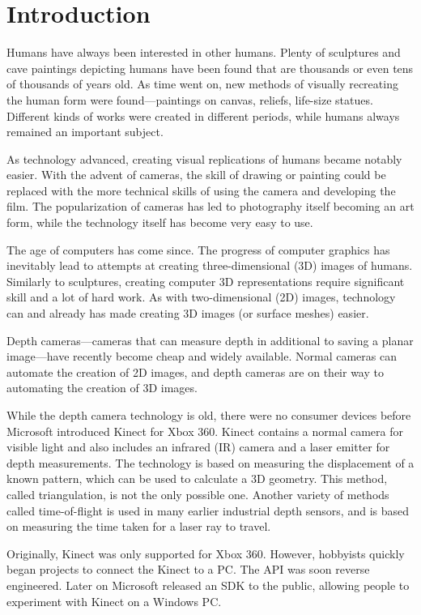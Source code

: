 \chapter{Introduction}

Humans have always been interested in other humans. Plenty of sculptures and cave paintings depicting humans have been found that are thousands or even tens of thousands of years old. As time went on, new methods of visually recreating the human form were found---paintings on canvas, reliefs, life-size statues. Different kinds of works were created in different periods, while humans always remained an important subject.

As technology advanced, creating visual replications of humans became notably easier. With the advent of cameras, the skill of drawing or painting could be replaced with the more technical skills of using the camera and developing the film. The popularization of cameras has led to photography itself becoming an art form, while the technology itself has become very easy to use.

The age of computers has come since. The progress of computer graphics has inevitably lead to attempts at creating three-dimensional (3D) images of humans. Similarly to sculptures, creating computer 3D representations require significant skill and a lot of hard work. As with two-dimensional (2D) images, technology can and already has made creating 3D images (or surface meshes) easier.

Depth cameras---cameras that can measure depth in additional to saving a planar image---have recently become cheap and widely available. Normal cameras can automate the creation of 2D images, and depth cameras are on their way to automating the creation of 3D images.

While the depth camera technology is old, there were no consumer devices before Microsoft introduced Kinect for Xbox 360. Kinect contains a normal camera for visible light and also includes an infrared (IR) camera and a laser emitter for depth measurements. The technology is based on measuring the displacement of a known pattern, which can be used to calculate a 3D geometry. This method, called triangulation, is not the only possible one. Another variety of methods called time-of-flight is used in many earlier industrial depth sensors, and is based on measuring the time taken for a laser ray to travel.


Originally, Kinect was only supported for Xbox 360. However, hobbyists quickly began projects to connect the Kinect to a PC. The API was soon reverse engineered. Later on Microsoft released an SDK to the public, allowing people to experiment with Kinect on a Windows PC.

